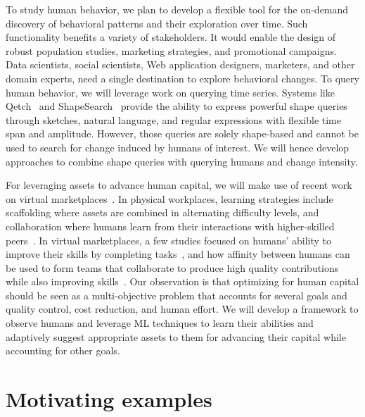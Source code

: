 \documentclass[11pt]{article}
\begin{document}
To study human behavior, we plan to develop a flexible tool for the on-demand discovery of behavioral patterns and their exploration over time. Such functionality benefits a variety of stakeholders. It would enable the design of robust population studies, marketing strategies, and promotional campaigns. Data scientists, social scientists, Web application designers, marketers, and other domain experts, need a single destination to explore behavioral changes.
To query human behavior, we will leverage work on querying time series. Systems like Qetch~\cite{DBLP:conf/sigmod/ManninoA18} and ShapeSearch~\cite{DBLP:conf/sigmod/SiddiquiLWKP20} provide the ability to express powerful shape queries through sketches, natural language, and regular expressions with flexible time span and amplitude. However, those queries are solely shape-based and cannot be used to search for change induced by humans of interest. We will hence develop approaches to combine shape queries with querying humans and change intensity.

For leveraging assets to advance human capital, we will make use of recent work on virtual marketplaces~\cite{DBLP:conf/kdd/EsfandiariWAR19}. In physical workplaces, learning strategies include scaffolding where assets are combined in alternating difficulty levels, and collaboration where humans learn from their interactions with higher-skilled peers~\cite{DLL+17,KH13,LL89}. In virtual marketplaces, a few studies focused on humans' ability to improve their skills by completing tasks~\cite{GD17}, and how affinity between humans can be used to form teams that collaborate to produce high quality contributions while also improving skills~\cite{DBLP:conf/kdd/EsfandiariWAR19}. Our observation is that optimizing for human capital should be seen as a multi-objective problem that accounts for several goals and quality control, cost reduction, and human effort. We will develop a framework to observe humans and leverage ML techniques to learn their abilities and adaptively suggest appropriate assets to them for advancing their capital while accounting for other goals.

\section{Motivating examples}
\end{document}
